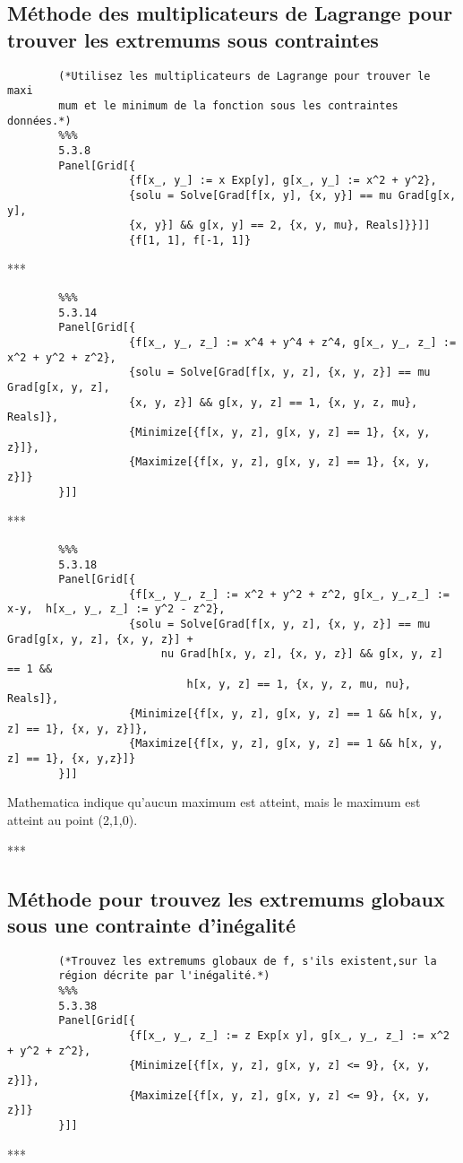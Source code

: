 \subsection{Méthode des multiplicateurs de Lagrange pour trouver les extremums sous contraintes}
		\begin{verbatim}
		(*Utilisez les multiplicateurs de Lagrange pour trouver le maxi­
		mum et le minimum de la fonction sous les contraintes données.*)
		%%%
		5.3.8
		Panel[Grid[{
		           {f[x_, y_] := x Exp[y], g[x_, y_] := x^2 + y^2},
		           {solu = Solve[Grad[f[x, y], {x, y}] == mu Grad[g[x, y], 
		           {x, y}] && g[x, y] == 2, {x, y, mu}, Reals]}}]]
		           {f[1, 1], f[-1, 1]}
	\end{verbatim}
	\begin{center}***\end{center}
	\begin{verbatim}
		%%%
		5.3.14
		Panel[Grid[{
		           {f[x_, y_, z_] := x^4 + y^4 + z^4, g[x_, y_, z_] := x^2 + y^2 + z^2},
		           {solu = Solve[Grad[f[x, y, z], {x, y, z}] == mu Grad[g[x, y, z], 
		           {x, y, z}] && g[x, y, z] == 1, {x, y, z, mu}, Reals]},
		           {Minimize[{f[x, y, z], g[x, y, z] == 1}, {x, y, z}]},
		           {Maximize[{f[x, y, z], g[x, y, z] == 1}, {x, y, z}]}
		}]]
	\end{verbatim}
	\begin{center}***\end{center}
	\begin{verbatim}
		%%%
		5.3.18
		Panel[Grid[{
		           {f[x_, y_, z_] := x^2 + y^2 + z^2, g[x_, y_,z_] := x-y,	h[x_, y_, z_] := y^2 - z^2},
		           {solu = Solve[Grad[f[x, y, z], {x, y, z}] == mu Grad[g[x, y, z], {x, y, z}] + 
		                nu Grad[h[x, y, z], {x, y, z}] && g[x, y, z] == 1 && 
		                    h[x, y, z] == 1, {x, y, z, mu, nu}, Reals]},
		           {Minimize[{f[x, y, z], g[x, y, z] == 1 && h[x, y, z] == 1}, {x, y, z}]},
		           {Maximize[{f[x, y, z], g[x, y, z] == 1 && h[x, y, z] == 1}, {x, y,z}]}
		}]]
	\end{verbatim}
	Mathematica indique qu'aucun maximum est atteint, mais le maximum est atteint au point (2,1,0).	
	\begin{center}***\end{center}

\subsection{Méthode pour trouvez les extremums globaux sous une contrainte d'inégalité}
	\begin{verbatim}
		(*Trouvez les extremums globaux de f, s'ils existent,sur la
		région décrite par l'inégalité.*)
		%%%
		5.3.38
		Panel[Grid[{
		           {f[x_, y_, z_] := z Exp[x y], g[x_, y_, z_] := x^2 + y^2 + z^2},
		           {Minimize[{f[x, y, z], g[x, y, z] <= 9}, {x, y, z}]},
		           {Maximize[{f[x, y, z], g[x, y, z] <= 9}, {x, y, z}]}
		}]]
	\end{verbatim}
	\begin{center}***\end{center}
